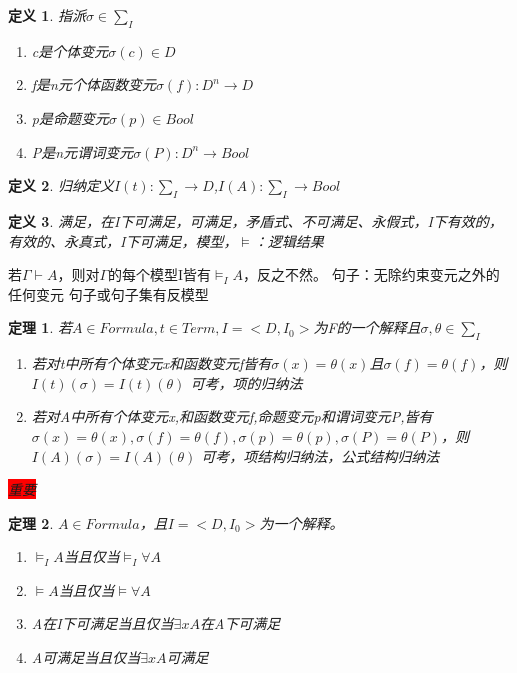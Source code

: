\documentclass[a4paper]{ctexart}
\newtheorem{thm}{\hspace{2em}定理}[subsection]
\newtheorem{defi}{\hspace{2em}定义}[subsection]
\newcommand{\shade}[1]{\colorbox{shadecolor}{#1}}
\newcommand{\redshade}[1]{\colorbox{red}{#1}}
\begin{document}
\begin{defi}
  指派$\sigma\in \sum_I$
  \begin{enumerate}
    \item c是个体变元$\sigma(c)\in D$
    \item f是n元个体函数变元$\sigma(f):D^n\rightarrow D$
    \item p是命题变元$\sigma(p)\in Bool$
    \item P是n元谓词变元$\sigma(P):D^n\rightarrow Bool$
  \end{enumerate}
\end{defi}

\begin{defi}
  归纳定义$I(t):\sum_I\rightarrow D$,$I(A):\sum_I\rightarrow Bool$
\end{defi}

\begin{defi}
  满足，在I下可满足，可满足，矛盾式、不可满足、永假式，I下有效的，有效的、永真式，I下可满足，模型，$\models$：逻辑结果
\end{defi}
若$\Gamma\vdash A$，则对$\Gamma$的每个模型I皆有$\models_IA$，反之不然。
句子：无除约束变元之外的任何变元
句子或句子集有反模型
\begin{thm}
  若$A\in Formula,t\in Term,I=<D,I_0>$为F的一个解释且$\sigma,\theta\in\sum_I$
  \begin{enumerate}[itemindent=2em]
    \item 若对t中所有个体变元x和函数变元f皆有$\sigma(x)=\theta(x)$且$\sigma(f)=\theta(f)$，则$I(t)(\sigma)=I(t)(\theta)$ \shade{可考，项的归纳法}
    \item 若对A中所有个体变元x,和函数变元f,命题变元p和谓词变元P,皆有$\sigma(x)=\theta(x),\sigma(f)=\theta(f),\sigma(p)=\theta(p),\sigma(P)=\theta(P)$，则$I(A)(\sigma)=I(A)(\theta)$ \shade{可考，项结构归纳法，公式结构归纳法}
  \end{enumerate} \redshade{重要}
\end{thm}

\begin{thm}
  $A\in Formula$，且$I=<D,I_0>$为一个解释。
  \begin{enumerate}[itemindent=2em]
    \item $\models_IA$当且仅当$\models_I\forall{A}$
    \item $\models A$当且仅当$\models\forall{A}$
    \item A在I下可满足当且仅当$\exists{x}A$在A下可满足
    \item A可满足当且仅当$\exists{x}A$可满足
  \end{enumerate}
\end{thm}
\end{document}
